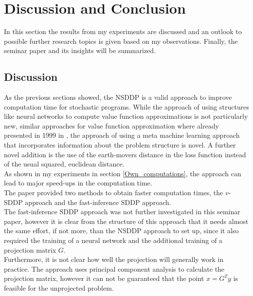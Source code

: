\section{Discussion and Conclusion}\label{Discussion and conlcusion}
In this section the results from my experiments are discussed and an outlook to possible further research topics is given based on my observations.
Finally, the seminar paper and its insights will be summarized.
\subsection{Discussion}\label{Discussion}
As the previous sections showed, the NSDDP is a valid approach to improve computation time for stochastic programs.
While the approach of using structures like neural networks to compute value function approximations is not particularly new, similar approaches for value function approximation where already presented in 1999 in \cite{Neuro-dynamic-programming}, the approach of using a meta machine learning approach that incorporates information about the problem structure is novel.
A further novel addition is the use of the earth-movers distance in the loss function instead of the usual squared, euclidean distance. \\
As shown in my experiments in section \ref{Own_computations}, the approach can lead to major speed-ups in the computation time. \\
The paper provided two methods to obtain faster computation times, the $v$-SDDP approach and the fast-inference SDDP approach. \\
The fast-inference SDDP approach was not further investigated in this seminar paper, however it is clear from the structure of this approach that it needs almost the same effort, if not more, than the NSDDP approach to set up, since it also required the training of a neural network and the additional training of a projection matrix $G$. \\
Furthermore, it is not clear how well the projection will generally work in practice.
The approach uses principal component analysis to calculate the projection matrix, however it can not be guaranteed that the point $x = G^Ty$ is feasible for the unprojected problem.

